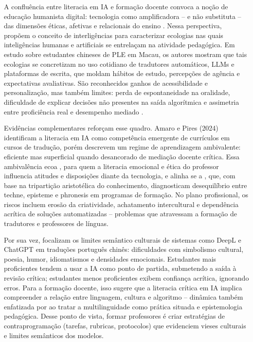 \documentclass[portuguese]{textolivre}
\begin{document}
A confluência entre literacia em IA e formação docente convoca a noção de educação humanista digital: tecnologia como amplificadora – e não substituta – das dimensões éticas, afetivas e relacionais do ensino \cite{UNESCO2023}. Nessa perspectiva, \textcite{PiresAmaro2025} propõem o conceito de interligências para caracterizar ecologias nas quais inteligências humanas e artificiais se entrelaçam na atividade pedagógica. Em estudo sobre estudantes chineses de PLE em Macau, os autores mostram que tais ecologias se concretizam no uso cotidiano de tradutores automáticos, LLMs e plataformas de escrita, que moldam hábitos de estudo, percepções de agência e expectativas avaliativas. São reconhecidos ganhos de acessibilidade e personalização, mas também limites: perda de espontaneidade na oralidade, dificuldade de explicar decisões não presentes na saída algorítmica e assimetria entre proficiência real e desempenho mediado \cite{PiresAmaro2025}.

Evidências complementares reforçam esse quadro. Amaro e Pires (2024) identificam a literacia em IA como competência emergente de currículos em cursos de tradução, porém descrevem um regime de aprendizagem ambivalente: eficiente mas superficial quando desancorado de mediação docente crítica. Essa ambivalência ecoa \textcite{XieEtAl2025}, para quem a literacia emocional e ética do professor influencia atitudes e disposições diante da tecnologia, e alinha se a \textcite{SperlingEtAl2024}, que, com base na tripartição aristotélica do conhecimento, diagnosticam desequilíbrio entre techne, episteme e phronesis em programas de formação. No plano profissional, os riscos incluem erosão da criatividade, achatamento intercultural e dependência acrítica de soluções automatizadas – problemas que atravessam a formação de tradutores e professores de línguas.

Por sua vez, \textcite{AmaroZhang2025} focalizam os limites semântico culturais de sistemas como DeepL e ChatGPT em traduções português chinês: dificuldades com simbolismo cultural, poesia, humor, idiomatismos e densidades emocionais. Estudantes mais proficientes tendem a usar a IA como ponto de partida, submetendo a saída à revisão crítica; estudantes menos proficientes exibem confiança acrítica, ignorando erros. Para a formação docente, isso sugere que a literacia crítica em IA implica compreender a relação entre linguagem, cultura e algoritmo – dinâmica também enfatizada por \textcite{Agnihotri2025} ao tratar a multilinguidade como prática situada e epistemologia pedagógica. Desse ponto de vista, formar professores é criar estratégias de contraprogramação (tarefas, rubricas, protocolos) que evidenciem vieses culturais e limites semânticos dos modelos.
\end{document}
